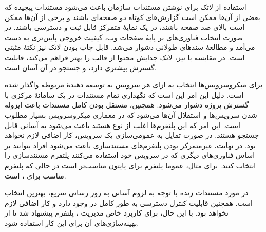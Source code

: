 \documentclass{cake-classes/short-report-fa}
\begin{document}
استفاده از لاتک برای نوشتن مستندات سازمان باعث می‌شود مستندات پیچیده که بعضی از آن‌ها ممکن است گزارش‌های کوتاه دو صفحه‌ای باشند و برخی از آن‌ها ممکن است بالای صد صفحه باشند، در یک نمایهٔ متمرکز قابل ثبت و دسترسی باشند. در صورت انتخاب فناوری‌های بر پایهٔ‌ صفحات وب، کیفیت خروجی پایین‌تری به دست می‌آمد و مطالعهٔ سندهای طولانی دشوار می‌شد. قابل چاپ بودن لاتک نیز نکتهٔ مثبتی است. در مقایسه با  نیز، لاتک جدایش محتوا از قالب را بهتر فراهم می‌کند، قابلیت گسترش بیشتری دارد، و جستجو در آن آسان است.

برای میکروسرویس‌ها انتخاب به ازای هر سرویس به توسعه دهندهٔ مربوطه واگذار شده است. دلیل این امر این است که نگهداری تمام مستندات در یک سامانهٔ مرکزی با گسترش پروژه دشوار می‌شود. همچنین، مستقل بودن کامل مستندات باعث ایزوله شدن سرویس‌ها و استقلال آن‌ها می‌شود که در معماری میکروسرویس بسیار مطلوب است. این امر که این پلتفرم‌ها اغلب از نوع  هستند باعث می‌شود به آسانی قابل جستجو هستند. در صورت تمایل به عمومی‌سازی یک سرویس، کار اضافی لازم نخواهد بود. در نهایت، غیرمتمرکز بودن پلتفرم‌های مستندسازی  باعث می‌شود افراد بتوانند بر اساس فناوری‌های دیگری که در سرویس خود استفاده می‌کنند پلتفرم مستندسازی را انتخاب کنند. برای مثال، عموما پلتفرم  برای پایتون مناسب‌تر است در حالی که پلتفرم مناسب برای ،  است.

در مورد مستندات زنده با توجه به لزوم آسانی به روز رسانی سریع،  بهترین انتخاب است. همچنین قابلیت کنترل دسترسی به طور کامل در  وجود دارد و کار اضافی لازم نخواهد بود. با این حال، برای کاربرد خاص مدیریت ، پلتفرم  پیشنهاد شد تا از بهینه‌سازی‌های آن برای این کار استفاده شود.
\end{document}
